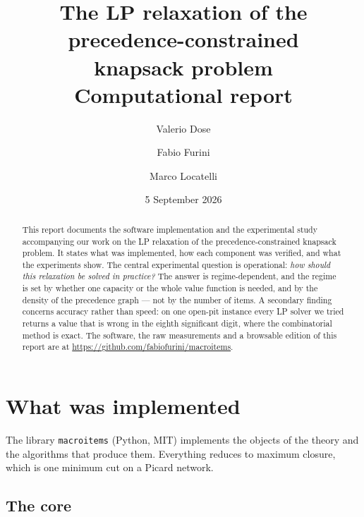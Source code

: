 \documentclass[11pt,a4paper]{article}
\title{\textbf{The LP relaxation of the precedence-constrained\\ knapsack problem}\\[2mm]
\large Computational report}
\author{Valerio Dose \and Fabio Furini \and Marco Locatelli}
\date{5 September 2026}
\newcommand{\code}[1]{\texttt{#1}}
\begin{document}
\maketitle

\begin{abstract}
\noindent
This report documents the software implementation and the experimental study
accompanying our work on the LP relaxation of the precedence-constrained
knapsack problem. It states what was implemented, how each component was
verified, and what the experiments show. The central experimental question is
operational: \emph{how should this relaxation be solved in practice?} The
answer is regime-dependent, and the regime is set by whether one capacity or
the whole value function is needed, and by the density of the precedence
graph --- not by the number of items. A secondary finding concerns accuracy
rather than speed: on one open-pit instance every LP solver we tried returns a
value that is wrong in the eighth significant digit, where the combinatorial
method is exact. The software, the raw measurements and a browsable edition of
this report are at \url{https://github.com/fabiofurini/macroitems}.
\end{abstract}

\tableofcontents
\bigskip

\section{What was implemented}
\label{sec:implemented}

The library \code{macroitems} (Python, MIT) implements the objects of the
theory and the algorithms that produce them. Everything reduces to maximum
closure, which is one minimum cut on a Picard network.

\subsection{The core}
\end{document}
